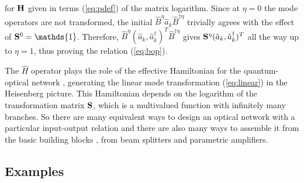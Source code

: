 \documentclass[12pt,amsmath,amssymb]{article}
\def\underline#1{{\bf #1}}
\numberwithin{equation}{section}
\begin{document}
for $\underline{H}$ given in terms (\ref{eq:pdef}) of the matrix
logarithm. Since at $\eta=0$ the mode operators are not
transformed, the initial $\hat{B}^\eta \hat{a}_k
\hat{B}^{\dagger\eta}$ trivially agrees with the effect of
$\underline{S}^0=\mathds{1}$. Therefore, $\hat{B}^\eta(\hat{a}_k,
\hat{a}_k^\dagger)^T\hat{B}^{\dagger\eta}$ gives
$\underline{S}^\eta(\hat{a}_k, \hat{a}_k^\dagger)^T$ all the way
up to $\eta=1$, thus proving the relation (\ref{eq:bop}).

The $\hat{H}$ operator plays the role of the effective Hamiltonian
for the quantum-optical network \cite{Torma1,Torma3}, generating
the linear mode transformation (\ref{eq:linear}) in the Heisenberg
picture. This Hamiltonian depends on the logarithm of the
transformation matrix $\underline{S}$, which is a multivalued
function with infinitely many branches. So there are
many equivalent ways to design an optical network with a
particular input-output relation and there are also many ways
to assemble it from the
basic building blocks \cite{Reck,Torma1,Torma3}, from beam
splitters and parametric amplifiers.

\subsection{Examples}
\end{document}
